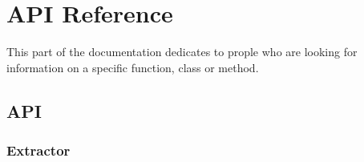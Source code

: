 \documentclass[letterpaper,10pt,english]{sphinxmanual}
\begin{document}
\chapter{API Reference}
\label{index:api-reference}
This part of the documentation dedicates to prople who are looking for information on a specific function, class or method.


\section{API}
\label{docs/api:api}\label{docs/api::doc}\label{docs/api:id1}

\subsection{Extractor}
\label{docs/api:extractor}
\end{document}
